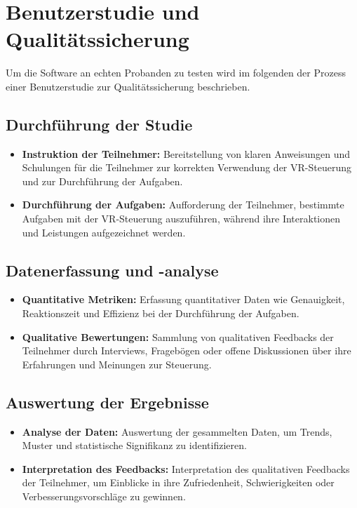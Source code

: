 \chapter{Benutzerstudie und Qualitätssicherung}
Um die Software an echten Probanden zu testen wird im folgenden der Prozess einer Benutzerstudie zur Qualitätssicherung beschrieben.
\section{Durchführung der Studie}
\begin{itemize}
   \item \textbf{Instruktion der Teilnehmer:} Bereitstellung von klaren Anweisungen und Schulungen für die Teilnehmer zur korrekten Verwendung der VR-Steuerung und zur Durchführung der Aufgaben.
   \item \textbf{Durchführung der Aufgaben:} Aufforderung der Teilnehmer, bestimmte Aufgaben mit der VR-Steuerung auszuführen, während ihre Interaktionen und Leistungen aufgezeichnet werden.
\end{itemize}

\section{Datenerfassung und -analyse}
\begin{itemize}
   \item \textbf{Quantitative Metriken:} Erfassung quantitativer Daten wie Genauigkeit, Reaktionszeit und Effizienz bei der Durchführung der Aufgaben.
   \item \textbf{Qualitative Bewertungen:} Sammlung von qualitativen Feedbacks der Teilnehmer durch Interviews, Fragebögen oder offene Diskussionen über ihre Erfahrungen und Meinungen zur Steuerung.
\end{itemize}

\section{Auswertung der Ergebnisse}
\begin{itemize}
   \item \textbf{Analyse der Daten:} Auswertung der gesammelten Daten, um Trends, Muster und statistische Signifikanz zu identifizieren.
   \item \textbf{Interpretation des Feedbacks:} Interpretation des qualitativen Feedbacks der Teilnehmer, um Einblicke in ihre Zufriedenheit, Schwierigkeiten oder Verbesserungsvorschläge zu gewinnen.
\end{itemize}

